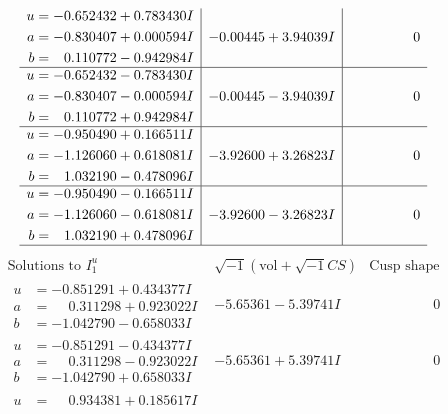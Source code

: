 \documentclass[1p]{elsarticle_modified}
\theoremstyle{definition}
\newcommand{\I}{\sqrt{-1}}
\begin{document}
$$\begin{array}{c|c|c}
\begin{aligned}
u &= -0.652432 + 0.783430 I \\
a &= -0.830407 + 0.000594 I \\
b &= \phantom{-}0.110772 - 0.942984 I\end{aligned}
 & -0.00445 + 3.94039 I & \phantom{-0.000000 } 0 \\ \hline\begin{aligned}
u &= -0.652432 - 0.783430 I \\
a &= -0.830407 - 0.000594 I \\
b &= \phantom{-}0.110772 + 0.942984 I\end{aligned}
 & -0.00445 - 3.94039 I & \phantom{-0.000000 } 0 \\ \hline\begin{aligned}
u &= -0.950490 + 0.166511 I \\
a &= -1.126060 + 0.618081 I \\
b &= \phantom{-}1.032190 - 0.478096 I\end{aligned}
 & -3.92600 + 3.26823 I & \phantom{-0.000000 } 0 \\ \hline\begin{aligned}
u &= -0.950490 - 0.166511 I \\
a &= -1.126060 - 0.618081 I \\
b &= \phantom{-}1.032190 + 0.478096 I\end{aligned}
 & -3.92600 - 3.26823 I & \phantom{-0.000000 } 0\\
 \hline 
 \end{array}$$\newpage$$\begin{array}{c|c|c}  
\text{Solutions to }I^u_{1}& \I (\text{vol} + \sqrt{-1}CS) & \text{Cusp shape}\\
 \hline 
\begin{aligned}
u &= -0.851291 + 0.434377 I \\
a &= \phantom{-}0.311298 + 0.923022 I \\
b &= -1.042790 - 0.658033 I\end{aligned}
 & -5.65361 - 5.39741 I & \phantom{-0.000000 } 0 \\ \hline\begin{aligned}
u &= -0.851291 - 0.434377 I \\
a &= \phantom{-}0.311298 - 0.923022 I \\
b &= -1.042790 + 0.658033 I\end{aligned}
 & -5.65361 + 5.39741 I & \phantom{-0.000000 } 0 \\ \hline\begin{aligned}
u &= \phantom{-}0.934381 + 0.185617 I \\

\end{aligned}
\end{array}$$
\end{document}
